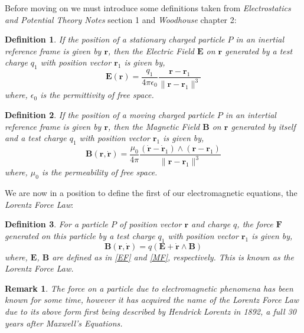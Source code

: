 \documentclass[a4paper,12pt,draft]{report}
\newtheorem{remark}{Remark}
\newtheorem{definition}{Definition}
\begin{document}
Before moving on we must introduce some definitions taken from \emph{Electrostatics and Potential Theory Notes} \cite{ADN} section 1 and \emph{Woodhouse} \cite{NMJW} chapter 2:

\begin{definition}
If the position of a stationary charged particle $P$ in an inertial reference frame is given by $\mathbf{r}$, then the Electric Field $\mathbf{E}$ on $\mathbf{r}$ generated by a test charge $q_1$ with position vector $\mathbf{r}_1$ is given by,
\begin{equation}
\mathbf{E}(\mathbf{r}) = \frac{q_1}{4\pi\epsilon_0}\frac{\mathbf{r} - \mathbf{r}_1}{\|\mathbf{r} - \mathbf{r}_1\|^3} \label{EF}
\end{equation}
where, $\epsilon_0$ is the permittivity of free space.
\end{definition}

\begin{definition}
If the position of a moving charged particle $P$ in an intertial reference frame is given by $\mathbf{r}$, then the Magnetic Field $\mathbf{B}$ on $\mathbf{r}$ generated by itself and a test charge $q_1$ with position vector $\mathbf{r}_1$ is given by,
\begin{equation}
\mathbf{B}(\mathbf{r}, \dot{\mathbf{r}}) = \frac{\mu_0}{4\pi}\frac{(\dot{\mathbf{r}} - \dot{\mathbf{r}}_1) \wedge (\mathbf{r} - \mathbf{r}_1)}{\|\mathbf{r} - \mathbf{r}_1\|^3} \label{MF}
\end{equation}
where, $\mu_0$ is the permeability of free space.
\end{definition}

We are now in a position to define the first of our electromagnetic equations, the \emph{Lorentz Force Law}:
\begin{definition}
For a particle $P$ of position vector $\mathbf{r}$ and charge $q$, the force $\mathbf{F}$ generated on this particle by a test charge $q_1$ with position vector $\mathbf{r}_1$ is given by,
\begin{equation}
\mathbf{B}(\mathbf{r}, \dot{\mathbf{r}}) = q(\mathbf{E} + \dot{\mathbf{r}} \wedge \mathbf{B})
\end{equation}
where, $\mathbf{E}$, $\mathbf{B}$ are defined as in \eqref{EF} and \eqref{MF}, respectively. This is known as the Lorentz Force Law.
\end{definition}

\begin{remark}
The force on a particle due to electromagnetic phenomena has been known for some time, however it has acquired the name of the Lorentz Force Law due to its above form first being described by Hendrick Lorentz in 1892, a full 30 years after Maxwell's Equations.
\end{remark}
\end{document}
